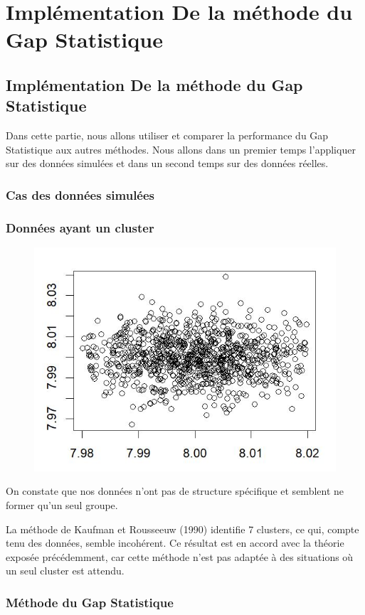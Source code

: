 \chapter{Implémentation De la méthode du Gap Statistique}

\startcontents[Implémentation]

\section{Implémentation De la méthode du Gap Statistique}

Dans cette partie, nous allons utiliser et comparer la performance du Gap Statistique aux autres méthodes. Nous allons dans un premier temps l'appliquer sur des données simulées et dans un second temps sur des données réelles.

\subsection{Cas des données simulées}
\subsection*{Données ayant un cluster}

\begin{figure}[H]
    \centering
    \includegraphics[width=0.5\linewidth]{images/don1.JPG}
    \caption{}
    \label{fig:enter-label}
\end{figure}

On constate que nos données n'ont pas de structure spécifique et semblent ne former qu'un seul groupe. 

La méthode de Kaufman et Rousseeuw (1990) identifie 7 clusters, ce qui, compte tenu des données, semble incohérent. Ce résultat est en accord avec la théorie exposée précédemment, car cette méthode n'est pas adaptée à des situations où un seul cluster est attendu. 
\subsection*{Méthode du Gap Statistique}

